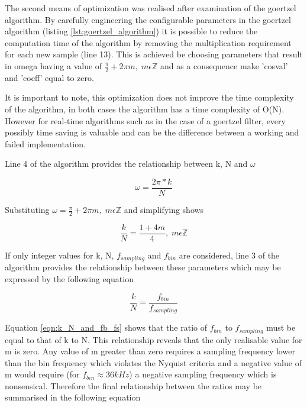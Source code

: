 The second means of optimization was realised after examination of the goertzel algorithm. By carefully engineering the configurable parameters in the goertzel algorithm (listing \ref{lst:goertzel_algorithm}) it is possible to reduce the computation time of the algorithm by removing the multiplication requirement for each new sample (line 13). This is achieved be choosing parameters that result in omega having a value of \(\frac{\pi}{2} + 2\pi m,\; m\epsilon \mathbb{Z}\) and as a consequence make 'cosval' and 'coeff' equal to zero.

It is important to note, this optimization does not improve the time complexity of the algorithm, in both cases the algorithm has a time complexity of O(N). However for real-time algorithms such as in the case of a goertzel filter, every possibly time saving is valuable and can be the difference between a working and failed implementation.

Line 4 of the algorithm provides the relationship between k, N and $\omega$

\begin{equation}
	\omega = \frac{2\pi * k}{N}
\end{equation}

Substituting \(\omega = \frac{\pi}{2} + 2\pi m,\; m\epsilon \mathbb{Z}\) and simplifying shows

\begin{equation}
\label{eqn:k_N_constraint}
	\frac{k}{N} = \frac{1+4m}{4},\; m\epsilon \mathbb{Z}
\end{equation}

If only integer values for k, N, $f_{sampling}$ and $f_{bin}$ are considered, line 3 of the algorithm provides the relationship between these parameters which may be expressed by the following equation

\begin{equation}
\label{eqn:k_N_and_fb_fs}
	\frac{k}{N} = \frac{f_{bin}}{f_{sampling}}
\end{equation}


Equation \ref{eqn:k_N_and_fb_fs} shows that the ratio of $f_{bin}$ to $f_{sampling}$ must be equal to that of k to N. This relationship reveals that the only realisable value for m is zero. Any value of m greater than zero requires a sampling frequency lower than the bin frequency which violates the Nyquist criteria and a negative value of m would require (for $f_{bin} \approx 36kHz$) a negative sampling frequency which is nonsensical. Therefore the final relationship between the ratios may be summarised in the following equation

